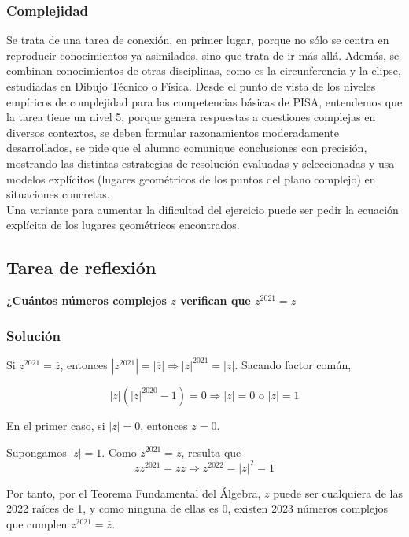 \documentclass[../main.tex]{memoir}
\begin{document}
\subsubsection{Complejidad}
Se trata de una tarea de conexión, en primer lugar, porque no sólo se centra en reproducir conocimientos ya asimilados, sino que trata de ir más allá. Además, se combinan conocimientos de otras disciplinas, como es la circunferencia y la elipse, estudiadas en Dibujo Técnico o Física. Desde el punto de vista de los niveles empíricos de complejidad para las competencias básicas de PISA, entendemos que la tarea tiene un nivel 5, porque genera respuestas a cuestiones complejas en diversos contextos, se deben formular razonamientos moderadamente desarrollados, se pide que el alumno comunique conclusiones con precisión, mostrando las distintas estrategias de resolución evaluadas y seleccionadas y usa modelos explícitos (lugares geométricos de los puntos del plano complejo) en situaciones concretas. \\

Una variante para aumentar la dificultad del ejercicio puede ser pedir la ecuación explícita de los lugares geométricos encontrados.


\subsection{Tarea de reflexión}

\textbf{¿Cuántos números complejos $z$ verifican que $z^{2021} = \overline{z}$}

\subsubsection{Solución}

Si $z^{2021}= \overline{z}$, entonces $|z^{2021}|= |\overline{z}| \Rightarrow |z|^{2021} = |z|$. Sacando factor común, 

$$|z|(|z|^{2020}-1) = 0 \Rightarrow |z| = 0 \text{ o } |z| = 1$$

En el primer caso, si $|z| = 0$, entonces $z=0$.

Supongamos $|z| = 1$. Como  $z^{2021}= \overline{z}$, resulta que 
$$z z^{2021}= z \overline{z} \Rightarrow z^{2022} = |z|^2 = 1$$

Por tanto, por el Teorema Fundamental del Álgebra, $z$ puede ser cualquiera de las 2022 raíces de 1, y como ninguna de ellas es 0, existen 2023 números complejos que cumplen $z^{2021}= \overline{z}$.
\end{document}
